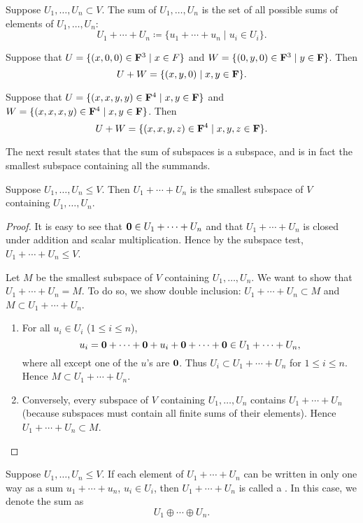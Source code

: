 \begin{definition}
Suppose $U_1,\dots,U_n\subset V$. The sum of $U_1,\dots,U_n$ is the set of all possible sums of elements of $U_1,\dots,U_n$:
\[U_1+\cdots+U_n\coloneqq\{u_1+\cdots+u_n\mid u_i\in U_i\}.\]
\end{definition}

\begin{example}
Suppose that $U=\{(x,0,0)\in\mathbf F^3\mid x\in F\}$ and $W=\{(0,y,0)\in\mathbf F^3\mid y\in\mathbf F\}$. Then
\[U+W=\{(x,y,0)\mid x,y\in\mathbf F\}.\]

Suppose that $U=\{(x,x,y,y)\in\mathbf F^4\mid x,y\in\mathbf F\}$ and $W=\{(x,x,x,y)\in\mathbf F^4\mid x,y\in\mathbf F\}$. Then
\[U+W=\{(x,x,y,z)\in\mathbf F^4\mid x,y,z\in\mathbf F\}.\]
\end{example}

The next result states that the sum of subspaces is a subspace, and is in fact the smallest subspace containing all the summands.

\begin{proposition}
Suppose $U_1,\dots,U_n\le V$. Then $U_1+\cdots+U_n$ is the smallest subspace of $V$ containing $U_1,\dots,U_n$.
\end{proposition}

\begin{proof}
It is easy to see that $\vb{0}\in U_1+\cdots+U_n$ and that $U_1+\cdots+U_n$ is closed under addition and scalar multiplication. Hence by the subspace test, $U_1+\cdots+U_n\le V$.

Let $M$ be the smallest subspace of $V$ containing $U_1,\dots,U_n$. We want to show that $U_1+\cdots+U_n=M$. To do so, we show double inclusion: $U_1+\cdots+U_n\subset M$ and $M\subset U_1+\cdots+U_n$.
\begin{enumerate}[label=(\roman*)]
\item For all $u_i\in U_i$ ($1\le i\le n$),
\[u_i=\vb{0}+\cdots+\vb{0}+u_i+\vb{0}+\cdots+\vb{0}\in U_1+\cdots+U_n,\]
where all except one of the $u$'s are $\vb{0}$. Thus $U_i\subset U_1+\cdots+U_n$ for $1\le i\le n$. Hence $M\subset U_1+\cdots+U_n$.
\item Conversely, every subspace of $V$ containing $U_1,\dots,U_n$ contains $U_1+\cdots+U_n$ (because subspaces must contain all finite sums of their elements). Hence $U_1+\cdots+U_n\subset M$.
\end{enumerate}
\end{proof}

\begin{definition}
Suppose $U_1,\dots,U_n\le V$. If each element of $U_1+\cdots+U_n$ can be written in only one way as a sum $u_1+\cdots+u_n$, $u_i\in U_i$, then $U_1+\cdots+U_n$ is called a . In this case, we denote the sum as
\[U_1\oplus\cdots\oplus U_n.\]
\end{definition}


